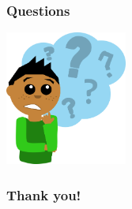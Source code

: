 \documentclass[12pt]{beamer}
\begin{document}
%


\begin{frame}
\frametitle{Questions}
\begin{center}
\includegraphics[width = 0.3\textwidth]{question.png}
\end{center}
\end{frame}
 
 
\begin{frame}
\frametitle{Thank you!}
\end{frame}
\end{document}
